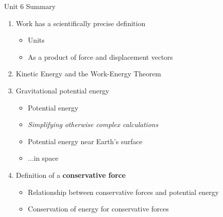 \documentclass{beamer}
\begin{document}
\begin{frame}{Unit 6 Summary}
\begin{enumerate}
\item \alert{Work} has a scientifically precise definition
\begin{itemize}
\item Units
\item As a product of force and displacement vectors
\end{itemize}
\item Kinetic Energy and the \alert{Work-Energy Theorem}
\item Gravitational potential energy
\begin{itemize}
\item Potential energy
\item \textit{Simplifying otherwise complex calculations}
\item Potential energy near Earth's surface
\item ...in space
\end{itemize}
\item Definition of a \textbf{conservative force}
\begin{itemize}
\item Relationship between conservative forces and potential energy
\item Conservation of energy for conservative forces
\end{itemize}
\end{enumerate}
\end{frame}
\end{document}

